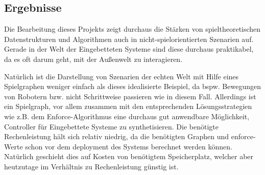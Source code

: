 \subsection{Ergebnisse}
Die Bearbeitung dieses Projekts zeigt durchaus die Stärken von spieltheoretischen Datenstrukturen und Algorithmen auch in nicht-spielorientierten Szenarien auf. Gerade in der Welt der Eingebetteten Systeme sind diese durchaus praktikabel, da es oft darum geht, mit der Außenwelt zu interagieren.\par
Natürlich ist die Darstellung von Szenarien der echten Welt mit Hilfe eines Spielgraphen weniger einfach als dieses idealisierte Beispiel, da bspw. Bewegungen von Robotern bzw. nicht Schrittweise passieren wie in diesem Fall. Allerdings ist ein Spielgraph, vor allem zusammen mit den entsprechenden Lösungsstrategien wie z.B. dem Enforce-Algorithmus eine durchaus gut anwendbare Möglichkeit, Controller für Eingebettete Systeme zu synthetisieren. Die benötigte Rechenleistung hält sich relativ niedrig, da die benötigten Graphen und enforce-Werte schon vor dem deployment des Systems berechnet werden können. Natürlich geschieht dies auf Kosten von benötigtem Speicherplatz, welcher aber heutzutage im Verhältnis zu Rechenleistung günstig ist.